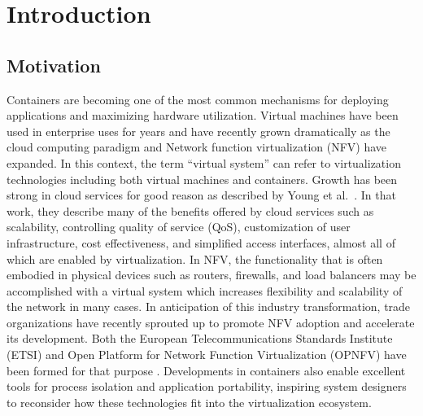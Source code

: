 \chapter{Introduction}
\label{sec:introduction}

\section{Motivation} %
\label{sec:motivation}
Containers are becoming one of the most common mechanisms for deploying applications and maximizing hardware utilization.
Virtual machines have been used in enterprise uses for years and have recently grown dramatically as the cloud computing paradigm and Network function virtualization (NFV) have expanded\autocite{cohnopnfv, opnfv1}.
In this context, the term ``virtual system'' can refer to virtualization technologies including both virtual machines and containers.
Growth has been strong in cloud services for good reason as described by Young et al.~\autocite{_younge_1}.
In that work, they describe many of the benefits offered by cloud services such as scalability, controlling quality of service (QoS), customization of user infrastructure, cost effectiveness, and simplified access interfaces, almost all of which are enabled by virtualization.  
In NFV, the functionality that is often embodied in physical devices such as routers, firewalls, and load balancers may be accomplished with a virtual system which increases flexibility and scalability of the network in many cases.
In anticipation of this industry transformation, trade organizations have recently sprouted up to promote NFV adoption and accelerate its development.
Both the European Telecommunications Standards Institute (ETSI) and Open Platform for Network Function Virtualization (OPNFV) have been formed for that purpose \autocite{opnfv1, cohnopnfv}.
Developments in containers also enable excellent tools for process isolation and application portability, inspiring system designers to reconsider how these technologies fit into the virtualization ecosystem.

